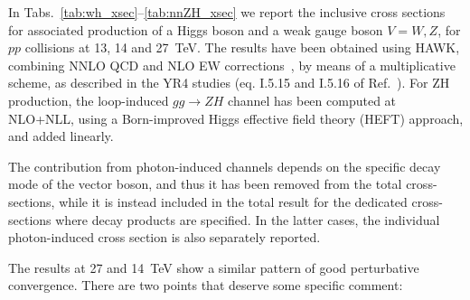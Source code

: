 In Tabs.~\ref{tab:wh_xsec}--\ref{tab:nnZH_xsec}
we report the inclusive cross sections for associated production of a Higgs
boson and a weak gauge boson $V=W,Z$, for $pp$ collisions at 13, 14 and 27~TeV.
The results have been obtained using HAWK, combining
NNLO QCD and NLO EW
corrections~\cite{Harlander:2018yio,Denner:2014cla,Harlander:2014wda,
Altenkamp:2012sx,Denner:2011id,Brein:2003wg,Ciccolini:2003jy}, by
means of a multiplicative scheme, as described in the YR4 studies (eq.
I.5.15 and I.5.16 of Ref.~\cite{deFlorian:2016spz}).  For ZH production, the
loop-induced $gg\rightarrow ZH$ channel has been computed at NLO+NLL, using a Born-improved Higgs effective field theory (HEFT) approach, and added linearly.

The contribution from photon-induced channels depends on the specific
decay mode of the vector boson, and thus it has been removed from the
total cross-sections, while it is instead included in the total result
for the dedicated cross-sections where decay products are
specified. In the latter cases, the individual photon-induced cross
section is also separately reported.

The results at 27 and 14~TeV show a similar pattern of good
perturbative convergence. There are two points that deserve some
specific comment:

